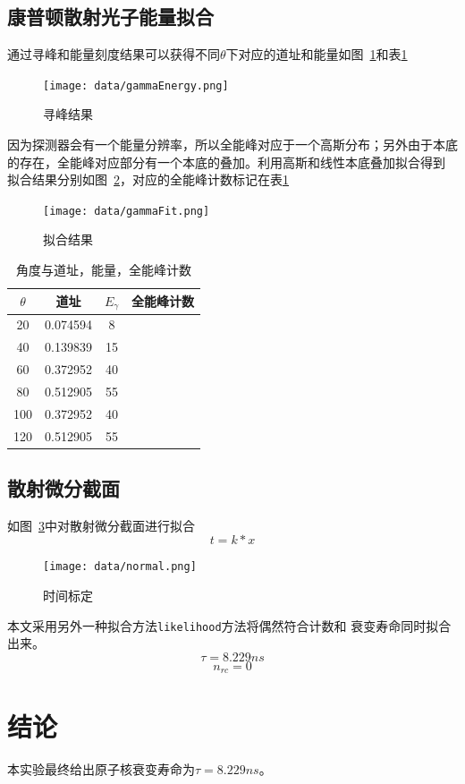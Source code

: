 \documentclass[10pt]{ctexart}
\begin{document}
\subsection{康普顿散射光子能量拟合}
通过寻峰和能量刻度结果可以获得不同$\theta$下对应的道址和能量如图~\ref{fig:gammaEnergy}和表\ref{tab:gammaEnergy}
\begin{figure}
    \centering
    \texttt{[image: data/gammaEnergy.png]}
    \caption{寻峰结果}
    \label{fig:gammaEnergy}
\end{figure}
因为探测器会有一个能量分辨率，所以全能峰对应于一个高斯分布；另外由于本底的存在，全能峰对应部分有一个本底的叠加。利用高斯和线性本底叠加拟合得到
拟合结果分别如图~\ref{fig:gammaFit}，对应的全能峰计数标记在表\ref{tab:gammaEnergy}
\begin{figure}
    \centering
    \texttt{[image: data/gammaFit.png]}
    \caption{拟合结果}
    \label{fig:gammaFit}
\end{figure}
\begin{table}
    \begin{tabular}{|c|c|c|c|}
        \textbf{$\theta$} & \textbf{道址}& \textbf{$E_{\gamma}$}& \textbf{全能峰计数}\\
        \hline
        20  &  0.074594&8&\\
        40   & 0.139839&15&\\
        60  &  0.372952&40&\\
        80  &  0.512905&55&\\
        100  &  0.372952&40&\\
        120  &  0.512905&55&\\
    \end{tabular}
    \centering
    \caption{角度与道址，能量，全能峰计数}
    \label{tab:gammaEnergy}
\end{table}
\subsection{散射微分截面}
如图~\ref{fig:fit}中对散射微分截面进行拟合
\[t=k*x\]
\begin{figure}[htbp]
    \centering
    \texttt{[image: data/normal.png]}
    \caption{时间标定}
    \label{fig:fit}
\end{figure}
本文采用另外一种拟合方法\texttt{likelihood}方法将偶然符合计数和
衰变寿命同时拟合出来。
\[\tau=8.229ns\]
\[n_{rc}=0\]
\section{结论}
本实验最终给出原子核衰变寿命为$\tau=8.229ns$。

\end{document}
